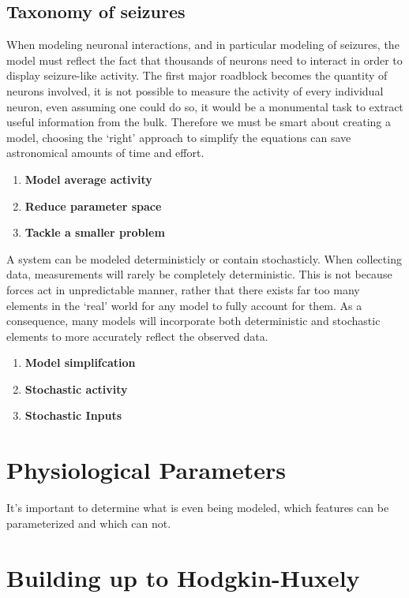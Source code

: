 \documentclass[../../Orator.tex]{subfiles}
\begin{document}
\subsection*{Taxonomy of seizures}


When modeling neuronal interactions, and in particular modeling of seizures, the model must reflect the fact that thousands of neurons need to interact in order to display seizure-like activity. 
The first major roadblock becomes the quantity of neurons involved, it is not possible to measure the activity of every individual neuron, even assuming one could do so, it would be a monumental task to extract useful information from the bulk. 
Therefore we must be smart about creating a model, choosing the `right' approach to simplify the equations can save astronomical amounts of time and effort.
\begin{enumerate}
    \item \textbf{Model average activity}
    \item \textbf{Reduce parameter space}
    \item \textbf{Tackle a smaller problem}
\end{enumerate}


A system can be modeled deterministicly or contain stochasticly. When collecting data, measurements will rarely be completely deterministic. This is not because forces act in unpredictable manner, rather that there exists far too many elements in the `real' world for any model to fully account for them. 
As a consequence, many models will incorporate both deterministic and stochastic elements to more accurately reflect the observed data.
\begin{enumerate}
    \item \textbf{Model simplifcation}
    \item \textbf{Stochastic activity}
    \item \textbf{Stochastic Inputs}
\end{enumerate}



\newpage
\section{Physiological Parameters}
It's important to determine what is even being modeled, which features can be parameterized and which can not.


\newpage
\section{Building up to Hodgkin-Huxely}
\end{document}
